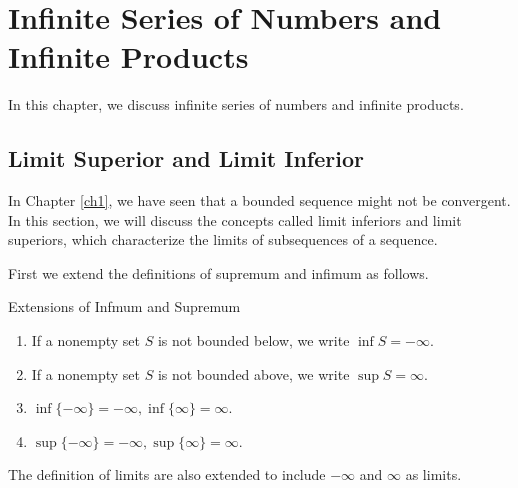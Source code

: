  
 
 

\chapter{Infinite Series of Numbers and Infinite Products }\label{ch5}
In this chapter, we discuss infinite series of numbers and infinite products.
 
 
\section{Limit Superior and Limit Inferior}\label{sec5.1}
In Chapter \ref{ch1}, we have seen that a bounded sequence might not be convergent. In this section, we will   discuss the concepts called limit inferiors and limit superiors, which characterize the limits of subsequences of a sequence. 

First we extend the definitions of supremum and infimum as follows. 
\begin{highlight}{Extensions of Infmum and Supremum}
\begin{enumerate}[1.]
\item  If a nonempty set $S$ is not bounded below, we write $\inf S=-\infty$.
\item If a nonempty set $S$ is not bounded above, we write $\sup S=\infty$.

\item $\inf\{-\infty\}=-\infty, \inf\{\infty\}=\infty$.
\item $\sup\{-\infty\}=-\infty, \sup\{\infty\}=\infty$.
\end{enumerate}
\end{highlight}
The definition of limits are also extended to include $-\infty$ and $\infty$ as limits.
 
